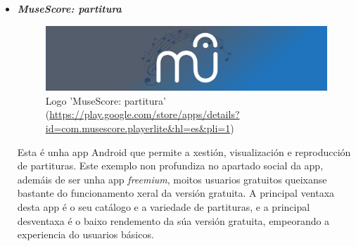 \begin{itemize}
	\item \textbf{\textit{MuseScore: partitura}} 
	
	\begin{figure}[h!]
		\centering
		\includegraphics[scale=0.3]{06_imagenes/intro/musescore-logo.jpg}
		\caption{Logo 'MuseScore: partitura' (\url{https://play.google.com/store/apps/details?id=com.musescore.playerlite&hl=es&pli=1})}
	\end{figure}
	
	Esta é unha app Android que permite a xestión, visualización e reproducción de partituras. Este exemplo non profundiza no apartado social da app, ademáis de ser unha app  \textit{freemium}, moitos usuarios gratuitos queixanse bastante do funcionamento xeral da versión gratuita.
	A principal ventaxa desta app é o seu catálogo e a variedade de partituras, e a principal desventaxa é o baixo rendemento da súa versión gratuita, empeorando a experiencia do usuarios básicos. 
	
\end{itemize}

